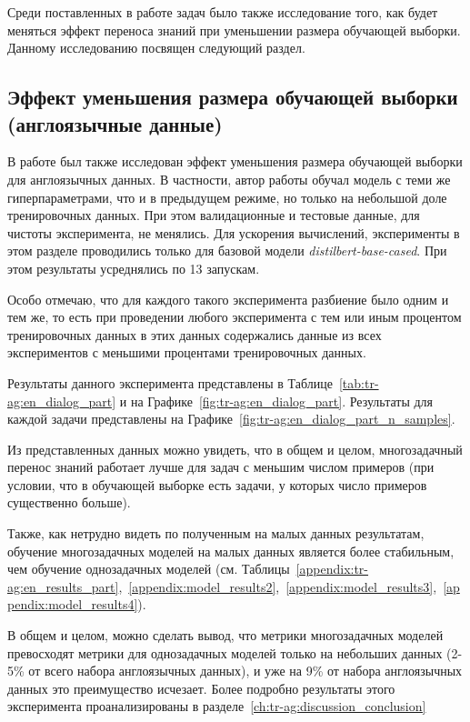 Среди поставленных в работе задач было также исследование того, как будет меняться эффект переноса знаний при уменьшении размера обучающей выборки. Данному исследованию посвящен следующий раздел. 

\subsection{Эффект уменьшения размера обучающей выборки (англоязычные данные)}
В работе был также исследован эффект уменьшения размера обучающей выборки для англоязычных данных. В частности, автор работы обучал модель с теми же гиперпараметрами, что и в предыдущем режиме, но только на небольшой доле тренировочных данных. При этом валидационные и тестовые данные, для чистоты эксперимента, не менялись. Для ускорения вычислений, эксперименты в этом разделе проводились только для базовой модели \textit{distilbert-base-cased}. При этом результаты усреднялись по 13 запускам.

Особо отмечаю, что для каждого такого эксперимента разбиение было одним и тем же, то есть при проведении любого эксперимента с тем или иным процентом тренировочных данных в этих данных содержались данные из всех экспериментов с меньшими процентами тренировочных данных. 

Результаты данного эксперимента представлены в Таблице~\ref{tab:tr-ag:en_dialog_part} и на Графике~\ref{fig:tr-ag:en_dialog_part}. Результаты для каждой задачи представлены на Графике~\ref{fig:tr-ag:en_dialog_part_n_samples}. %

Из представленных данных можно увидеть, что в общем и целом, многозадачный перенос знаний работает лучше для задач с меньшим числом примеров (при условии, что в обучающей выборке есть задачи, у которых число примеров существенно больше). 

Также, как нетрудно видеть по полученным на малых данных результатам, обучение многозадачных моделей на малых данных является более стабильным, чем обучение однозадачных моделей (см. Таблицы~\ref{appendix:tr-ag:en_results_part},~\ref{appendix:model_results2},~\ref{appendix:model_results3},~\ref{appendix:model_results4}).

В общем и целом, можно сделать вывод, что метрики многозадачных моделей превосходят метрики для однозадачных моделей только на небольших данных (2-5\% от всего набора англоязычных данных), и уже на 9\% от набора англоязычных данных это преимущество исчезает. Более подробно результаты этого эксперимента проанализированы в разделе~\ref{ch:tr-ag:discussion_conclusion}

